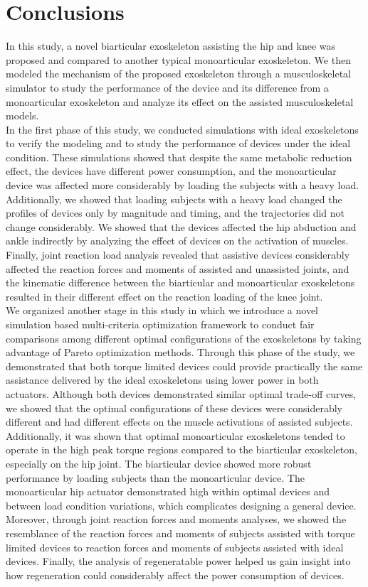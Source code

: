 \documentclass[10pt,letterpaper]{article}
\begin{document}
\section*{Conclusions}
In this study, a novel biarticular exoskeleton assisting the hip and knee was proposed and compared to another typical monoarticular exoskeleton. We then modeled the mechanism of the proposed exoskeleton through a musculoskeletal simulator to study the performance of the device and its difference from a monoarticular exoskeleton and analyze its effect on the assisted musculoskeletal models.\\
In the first phase of this study, we conducted simulations with ideal exoskeletons to verify the modeling and to study the performance of devices under the ideal condition. These simulations showed that despite the same metabolic reduction effect, the devices have different power consumption, and the monoarticular device was affected more considerably by loading the subjects with a heavy load. Additionally, we showed that loading subjects with a heavy load changed the profiles of devices only by magnitude and timing, and the trajectories did not change considerably. We showed that the devices affected the hip abduction and ankle indirectly by analyzing the effect of devices on the activation of muscles. Finally, joint reaction load analysis revealed that assistive devices considerably affected the reaction forces and moments of assisted and unassisted joints, and the kinematic difference between the biarticular and monoarticular exoskeletons resulted in their different effect on the reaction loading of the knee joint.\\
We organized another stage in this study in which we introduce a novel simulation based multi-criteria optimization framework to conduct fair comparisons among different optimal configurations of the exoskeletons by taking advantage of Pareto optimization methods. Through this phase of the study, we demonstrated that both torque limited devices could provide practically the same assistance delivered by the ideal exoskeletons using lower power in both actuators. Although both devices demonstrated similar optimal trade-off curves, we showed that the optimal configurations of these devices were considerably different and had different effects on the muscle activations of assisted subjects. Additionally, it was shown that optimal monoarticular exoskeletons tended to operate in the high peak torque regions compared to the biarticular exoskeleton, especially on the hip joint. The biarticular device showed more robust performance by loading subjects than the monoarticular device. The monoarticular hip actuator demonstrated high within optimal devices and between load condition variations, which complicates designing a general device. Moreover, through joint reaction forces and moments analyses, we showed the resemblance of the reaction forces and moments of subjects assisted with torque limited devices to reaction forces and moments of subjects assisted with ideal devices. Finally, the analysis of regeneratable power helped us gain insight into how regeneration could considerably affect the power consumption of devices.\\
\end{document}
